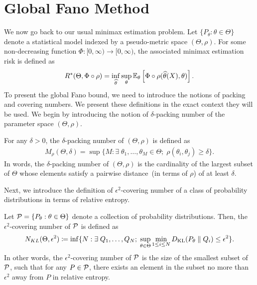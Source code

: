 \documentclass[12pt]{article}
\begin{document}
\section{Global Fano Method}
\label{sec:global-Fano}
We now go back to our usual minimax estimation problem. Let $\{P_\theta: \theta \in \Theta\}$ denote a statistical model indexed by a pseudo-metric space $(\Theta, \rho)$. For some non-decreasing function $\Phi: [0,\infty) \to [0, \infty)$, the associated minimax estimation risk is defined as 
\begin{align}
R^*(\Theta, \Phi \circ \rho) = \inf_{\widehat{\theta}} \sup_{\theta} \mathbb{E}_{\theta}\left[ \Phi \circ \rho(\widehat{\theta}(X), \theta) \right].
\end{align} 
To present the global Fano bound, we need to introduce the notions of packing and covering numbers. We present these definitions in the exact context they will be used. We begin by introducing the notion of $\delta$-packing number of the parameter space $(\Theta, \rho)$.  
\begin{definition}
	\label{def:packing-number} For any $\delta>0$,  the $\delta$-packing number of $(\Theta, \rho)$ is defined as 
	\begin{align}
		M_\rho(\Theta, \delta) = \sup \{M: \exists\; \theta_1, \ldots, \theta_M \in \Theta;\; \rho(\theta_i, \theta_j) \geq \delta\}.
	\end{align}
	In words, the $\delta$-packing number of $(\Theta, \rho)$ is the cardinality of the largest subset of $\Theta$ whose elements satisfy a pairwise distance~(in terms of $\rho$) of at least $\delta$. 
\end{definition}
Next, we introduce the definition of $\epsilon^2$-covering number of a class of probability distributions in terms of relative entropy. 
\begin{definition}
	\label{def:covering-number} Let ${\cal P} = \{P_\theta: \theta \in \Theta\}$ denote a collection of probability distributions. Then, the $\epsilon^2$-covering number of ${\cal P}$ is defined as 
	\begin{align}
	N_{KL}(\Theta, \epsilon^2) \coloneqq \inf \{N: \exists \; Q_1, \ldots, Q_N; \; \sup_{\theta \in \Theta} \min_{1 \leq i \leq N} D_{\text{KL}}(P_\theta \parallel Q_i) \leq \epsilon^2 \}. 
	\end{align}
	In other words, the $\epsilon^2$-covering number of ${\cal P}$ is the size of the smallest subset of ${\cal P}$, such that for any $P \in {\cal P}$, there exists an element in the subset no more than $\epsilon^2$ away from $P$ in relative entropy. 
\end{definition}
\end{document}
